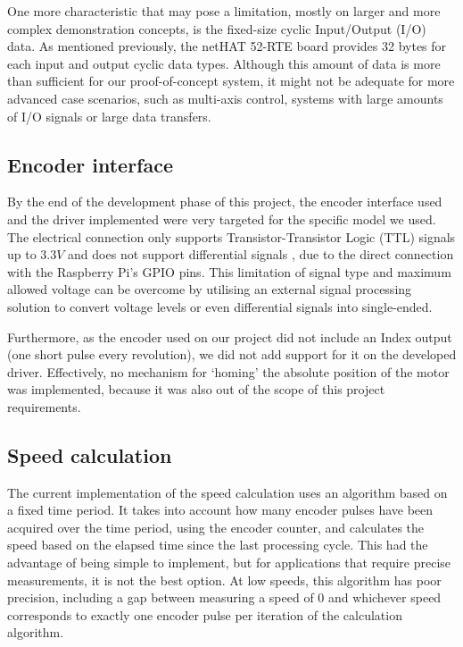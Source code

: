 One more characteristic that may pose a limitation, mostly on larger and more complex demonstration concepts, is the fixed-size cyclic Input/Output (I/O) data.
As mentioned previously, the netHAT 52-RTE board provides 32 bytes for each input and output cyclic data types.
Although this amount of data is more than sufficient for our proof-of-concept system, it might not be adequate for more advanced case scenarios, such as multi-axis control, systems with large amounts of I/O signals or large data transfers.

\subsection{Encoder interface}
By the end of the development phase of this project, the encoder interface used and the driver implemented were very targeted for the specific model we used.
The electrical connection only supports Transistor-Transistor Logic (TTL) signals up to $3.3V$ and does not support differential signals \cite{technology:diff-signals}, due to the direct connection with the Raspberry Pi's GPIO pins.
This limitation of signal type and maximum allowed voltage can be overcome by utilising an external signal processing solution to convert voltage levels or even differential signals into single-ended.

Furthermore, as the encoder used on our project did not include an Index output (one short pulse every revolution), we did not add support for it on the developed driver.
Effectively, no mechanism for `homing' the absolute position of the motor was implemented, because it was also out of the scope of this project requirements.

\subsection{Speed calculation}
The current implementation of the speed calculation uses an algorithm based on a fixed time period.
It takes into account how many encoder pulses have been acquired over the time period, using the encoder counter, and calculates the speed based on the elapsed time since the last processing cycle.
This had the advantage of being simple to implement, but for applications that require precise measurements, it is not the best option.
At low speeds, this algorithm has poor precision, including a gap between measuring a speed of 0 and whichever speed corresponds to exactly one encoder pulse per iteration of the calculation algorithm.

